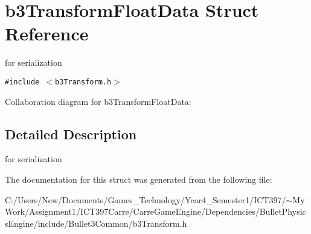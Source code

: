 \hypertarget{structb3_transform_float_data}{
\section{b3TransformFloatData Struct Reference}
\label{structb3_transform_float_data}
}
for serialization  


{\tt \#include $<$b3Transform.h$>$}

Collaboration diagram for b3TransformFloatData:

\subsection{Detailed Description}
for serialization 

The documentation for this struct was generated from the following file:\begin{CompactItemize}
\item 
C:/Users/New/Documents/Games\_\-Technology/Year4\_\-Semester1/ICT397/$\sim$My Work/Assignment1/ICT397Carre/CarreGameEngine/Dependencies/BulletPhysicsEngine/include/Bullet3Common/b3Transform.h\end{CompactItemize}
